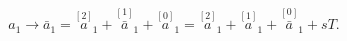 \begin{equation}
a_{1}\rightarrow \bar{a}_{1}=\stackrel{[2]}{a}_{1}+\stackrel{[1]}{\bar{a}}%
_{1}+\stackrel{[0]}{a}_{1}=\stackrel{[2]}{a}_{1}+\stackrel{[1]}{a}_{1}+%
\stackrel{[0]}{\bar{a}}_{1}+sT.  \label{bf78c}
\end{equation}

